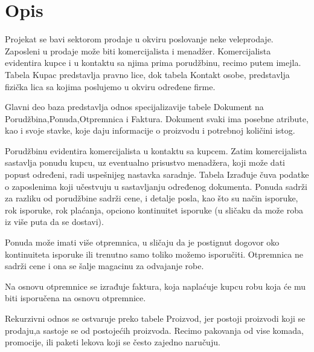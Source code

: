 \section{Opis}

Projekat se bavi sektorom prodaje u okviru poslovanje neke veleprodaje. Zaposleni u prodaje može biti komercijalista i menadžer. Komercijalista evidentira kupce i u kontaktu sa njima prima porudžbinu, recimo putem imejla. Tabela Kupac predstavlja pravno lice, dok tabela Kontakt osobe, predstavlja fizička lica sa kojima poslujemo u okviru određene firme.

Glavni deo baza predstavlja odnos specijalizavije tabele Dokument na Porudžbina,Ponuda,Otpremnica i Faktura. Dokument svaki ima posebne atribute, kao i svoje stavke, koje daju informacije o proizvodu i potrebnoj količini istog.

Porudžbinu evidentira komercijalista u kontaktu sa kupcem.
Zatim komercijalista sastavlja ponudu kupcu, uz eventualno prisustvo menadžera, koji može dati popust određeni, radi uspešnijeg nastavka saradnje. Tabela Izrađuje čuva podatke o zaposlenima koji učestvuju u sastavljanju određenog dokumenta. Ponuda sadrži za razliku od porudžbine sadrži cene, i detalje posla, kao što su način isporuke, rok isporuke, rok plaćanja, opciono kontinuitet isporuke (u sličaku da može roba iz više puta da se dostavi).

Ponuda može imati više otpremnica, u sličaju da je postignut dogovor oko kontinuiteta isporuke ili trenutno samo toliko možemo isporučiti. Otpremnica ne sadrži cene i ona se šalje magacinu za odvajanje robe. 

Na osnovu otpremnice se izrađuje faktura, koja naplaćuje kupcu robu koja će mu biti isporučena na osnovu otpremnice.

Rekurzivni odnos se ostvaruje preko tabele Proizvod, jer postoji proizvodi koji se prodaju,a sastoje se od postojećih proizvoda. Recimo pakovanja od vise komada, promocije, ili paketi lekova koji se često zajedno naručuju.


